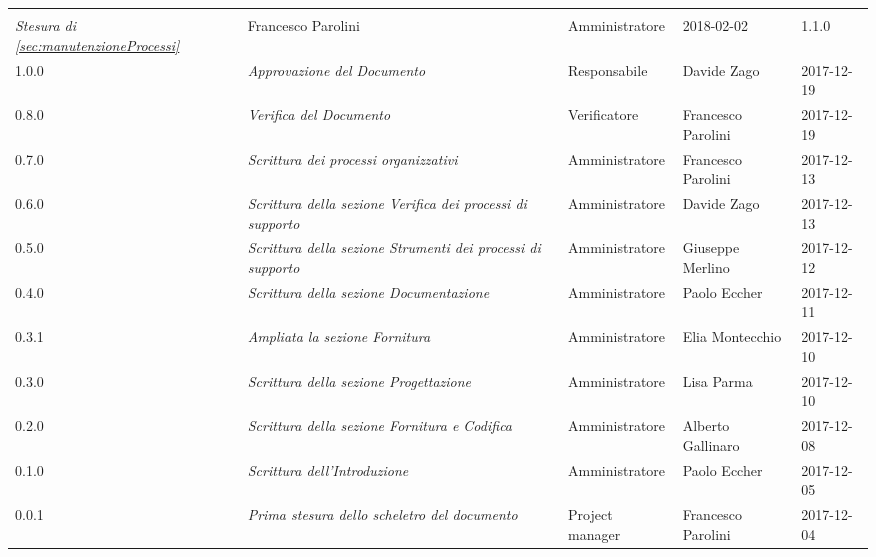 \newpage 
\section*{}
\begin{table}[H]
	\centering
	\begin{tabular}{p{2cm}|C{4cm}|C{3cm}|R{3cm}|R{2cm}}

		
		
		 &  & &  & \\
		

		\emph{Stesura di \ref{sec:manutenzioneProcessi}} & Francesco Parolini & Amministratore & 2018-02-02 & 1.1.0 \\
		\hline
		
		1.0.0  & \emph{Approvazione del Documento} & Responsabile & Davide Zago &  2017-12-19 \\
		\hline
		
		0.8.0  &  \emph{Verifica del Documento} & Verificatore & Francesco Parolini & 2017-12-19 \\
		\hline
		
		0.7.0  & \emph{Scrittura dei processi organizzativi}  & Amministratore & Francesco Parolini & 2017-12-13\\
		\hline
		
		0.6.0  & \emph{Scrittura della sezione Verifica dei processi di supporto} &  Amministratore & Davide Zago  & 2017-12-13 \\
		\hline
		
		0.5.0  & \emph{Scrittura della sezione Strumenti dei processi di supporto} & Amministratore & Giuseppe Merlino & 2017-12-12\\
		\hline
		
	   	0.4.0  &\emph{Scrittura della sezione Documentazione}& Amministratore & Paolo Eccher  & 2017-12-11 \\
		\hline
		
		 0.3.1 & \emph{Ampliata la sezione Fornitura}& Amministratore & Elia Montecchio & 2017-12-10 \\
		\hline
		
		0.3.0 & \emph{Scrittura della sezione Progettazione} & Amministratore & Lisa Parma & 2017-12-10 \\
		\hline
					
		0.2.0 & \emph{Scrittura della sezione Fornitura e Codifica} & Amministratore & Alberto Gallinaro & 2017-12-08 \\
		\hline
		
		0.1.0 & \emph{Scrittura dell'Introduzione} & Amministratore & Paolo Eccher & 2017-12-05 \\
		\hline
		
		0.0.1 &\emph{Prima stesura dello scheletro del documento} &  Project manager & Francesco Parolini & 2017-12-04 \\
	

	\end{tabular}
	
\end{table}


\clearpage